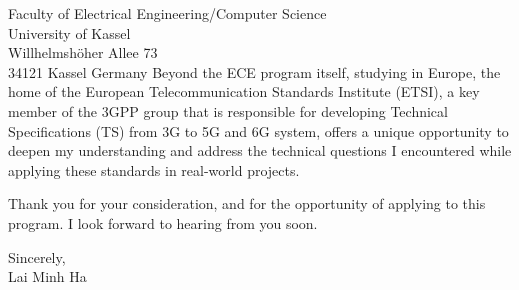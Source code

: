 \documentclass[a4paper,12pt]{letter}
\begin{document}
\begin{letter}{
    Faculty of Electrical Engineering/Computer Science
    \\ University of Kassel
    \\ Willhelmshöher Allee 73
    \\ 34121 Kassel Germany
}
Beyond the ECE program itself, studying in Europe, the home of the European Telecommunication Standards Institute (ETSI), a key member of the 3GPP group that is responsible for developing Technical Specifications (TS) from 3G to 5G and 6G system, offers a unique opportunity to deepen my understanding and address the technical questions I encountered while applying these standards in real-world projects.

\vspace{1cm}
Thank you for your consideration, and for the opportunity of applying to this program. I look forward to hearing from you soon.


\begin{flushright}
    Sincerely,
    \\ Lai Minh Ha
\end{flushright}

\end{letter}
\end{document}
